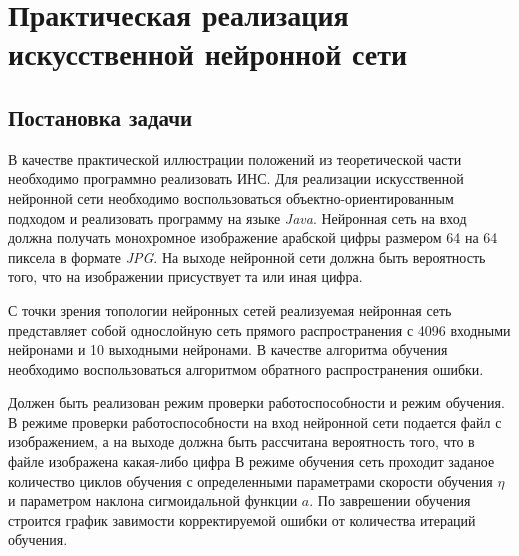 \section{Практическая реализация искусственной нейронной сети}	
\subsection{Постановка задачи}

В качестве практической иллюстрации положений из теоретической части необходимо программно реализовать ИНС.
Для реализации искусственной нейронной сети необходимо воспользоваться объектно-ориентированным подходом и реализовать программу на языке {\it Java}.
Нейронная сеть на вход должна получать монохромное изображение арабской цифры размером 64 на 64 пиксела в формате {\it JPG}.
На выходе нейронной сети должна быть вероятность того, что на изображении присуствует та или иная цифра.

С точки зрения топологии нейронных сетей реализуемая нейронная сеть представляет собой однослойную сеть прямого распространения с 4096 входными нейронами и 10 выходными нейронами.
В качестве алгоритма обучения необходимо воспользоваться алгоритмом обратного распространения ошибки.

Должен быть реализован режим проверки работоспособности и режим обучения.
В режиме проверки работоспособности на вход нейронной сети подается файл с изображением, а на выходе должна быть рассчитана вероятность того, что в файле изображена какая-либо цифра
В режиме обучения сеть проходит заданое количество циклов обучения с определенными параметрами скорости обучения $\eta$ и параметром наклона сигмоидальной функции $a$.
По заврешении обучения строится график завимости корректируемой ошибки от количества итераций обучения.

